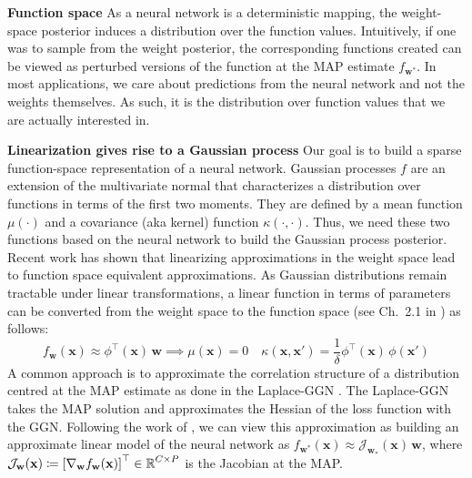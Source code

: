 \documentclass{article}
\newcommand{\weights}{\ensuremath{\mathbf{w}}}
\newcommand{\mbf}[1]{\mathbf{#1}}
\newcommand{\T}{\top}
\newcommand{\vx}{\mbf{x}}
\newcommand{\vw}{\mbf{w}}
\newcommand{\Jac}[2]{\mathcal{J}_{#1}(#2)}
\begin{document}
\textbf{Function space}
As a neural network is a deterministic mapping, the weight-space posterior induces a distribution over the function values.
Intuitively, if one was to sample from the weight posterior, the corresponding functions created can
be viewed as perturbed versions of the function at the MAP estimate $f_{\vw^*}$.
In most applications, we care about predictions from the neural network and not the weights themselves.
As such, it is the distribution over function values that we are actually interested in.


\textbf{Linearization gives rise to a Gaussian process}
Our goal is to build a sparse function-space representation of a neural network.
Gaussian processes $f$ are an extension of the multivariate normal that characterizes a distribution over
functions in terms of the first two moments.
They are defined by a mean function $\mu(\cdot)$ and a covariance (aka kernel) function $\kappa(\cdot,\cdot)$.
Thus, we need these two functions based on the neural network to build the Gaussian process posterior.
Recent work \citep{khan2019approximate,maddox2021fast} has shown that linearizing approximations in the weight space
lead to function space equivalent approximations.
As Gaussian distributions remain tractable under linear transformations, a linear function in
terms of parameters can be converted from the weight space to the function space (see Ch.~2.1 in \cite{rasmussen2006gaussian}) as follows:\begin{equation} \label{eq:weight_func}
f_\weights(\vx) \approx 
\phi^\top\!(\vx) \, \vw \implies \mu(\vx) = 0 \quad \kappa(\vx, \vx') = \frac{1}{\delta} \phi^\T\!(\vx) \, \phi(\vx')
\end{equation}
A common approach is to approximate the correlation structure of a distribution centred at the MAP estimate as done in the Laplace-GGN \citep{khan2019approximate, daxberger2021laplace, maddox2021fast}. The Laplace-GGN takes the MAP solution and approximates the Hessian of the loss function
with the GGN.
Following the work of \citep{khan2019approximate}, we can view this approximation as building an approximate linear model of the neural network as $f_{\weights^*}(\vx) \approx 
\Jac{\weights_*}{\vx} \, \weights$, where $\Jac{\weights}{\vx} \coloneqq \left[ \nabla_\weights f_\weights(\vx)\right]^\top \in \R^{C \times P}$ is the Jacobian at the MAP.
\end{document}
